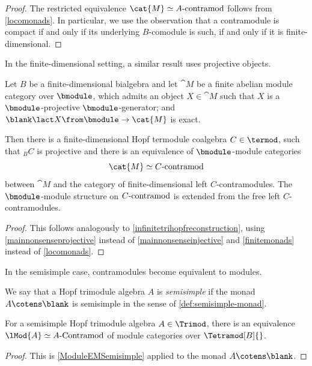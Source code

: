 \begin{proof}
  The restricted equivalence \(\cat{M} \simeq A\textnormal{-contramod}\) follows from \cref{locomonads}.
  In particular, we use the observation that a contramodule is compact
  if and only if its underlying \(B\)\hyp{}comodule is such,
  if and only if it is finite\hyp{}dimensional.
\end{proof}

In the finite\hyp{}dimensional setting, a similar result uses projective objects.

\begin{theorem}\label{finitetrihopfreconstruction}
  Let \(B\) be a finite\hyp{}dimensional bialgebra
  and let \(\cat{M}\) be a finite abelian module category over \(\bmodule\),
  which admits an object \(X \in \cat{M}\) such that
  \(X\) is a \(\bmodule\)\hyp{}projective \(\bmodule\)\hyp{}generator; and
  \(\blank \lact X\from \bmodule \to \cat{M}\) is exact.

  Then there is a finite\hyp{}dimensional Hopf termodule coalgebra \(C \in \termod\),
  such that \({}_{B}C\) is projective and there is an equivalence of \(\bmodule\)\hyp{}module categories
  \[
    \cat{M} \simeq C\textnormal{-contramod}
  \]
  between \(\cat{M}\) and the category of finite\hyp{}dimensional left \(C\)\hyp{}contramodules.
  The \(\bmodule\)\hyp{}module structure on \(C\textnormal{-contramod}\)
  is extended from the free left \(C\)\hyp{}contramodules.
\end{theorem}
\begin{proof}
  This follows analogously to \cref{infinitetrihopfreconstruction},
  using \cref{mainnonsenseprojective} instead of \cref{mainnonsenseinjective}
  and \cref{finitemonads} instead of \cref{locomonads}.
\end{proof}

In the semisimple case, contramodules become equivalent to modules.

\begin{definition}
  We say that a Hopf trimodule algebra \(A\) is \emph{semisimple}
  if the monad \(A \cotens \blank\) is semisimple in the sense of \cref{def:semisimple-monad}.
\end{definition}

\begin{proposition}\label{semisimpletrimodulealgebra}
  For a semisimple Hopf trimodule algebra \(A \in \Trimod\),
  there is an equivalence \(\lMod{A} \simeq A\textnormal{-Contramod}\) of module categories over \(\Tetramod[B]{}\).
\end{proposition}
\begin{proof}
  This is \cref{ModuleEMSemisimple} applied to the monad \(A \cotens \blank\).
\end{proof}

